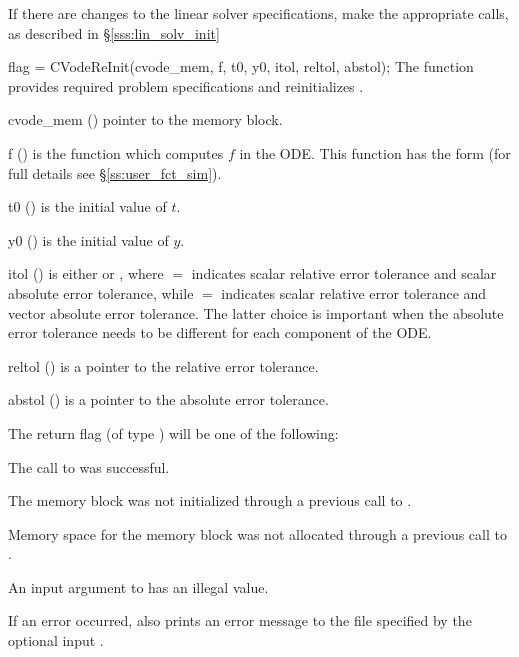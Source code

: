 If there are changes to the linear solver specifications, make the
appropriate  calls, as described in \S\ref{sss:lin_solv_init}

{
  flag = CVodeReInit(cvode\_mem, f, t0, y0, itol, reltol, abstol);
}
{
  The function  provides required problem specifications 
  and reinitializes {\cvode}.
}
{
  \begin{args}
  \item[cvode\_mem] ()
    pointer to the {\cvode} memory block.
  \item[f] ()
    is the {\C} function which computes $f$ in the ODE. This function has the form 
     (for full details see \S\ref{ss:user_fct_sim}).
  \item[t0] ()
    is the initial value of $t$.
  \item[y0] ()
    is the initial value of $y$. 
  \item[itol] () 
    is either  or , where $=$ indicates
    scalar relative error tolerance and scalar absolute error tolerance, while
    $=$ indicates scalar relative error tolerance and vector
    absolute error tolerance.  The latter choice is important when the absolute
    error tolerance needs to be different for each component of the ODE. 
  \item[reltol] ()
    is a pointer to the relative error tolerance.
  \item[abstol] ()
    is a pointer to the absolute error tolerance.
  \end{args}
}
{
  The return flag  (of type ) will be one of the following:
  \begin{args}[CV\_NO\_MALLOC]
  \item[\Id{CV\_SUCCESS}]
    The call to  was successful.
  \item[\Id{CV\_MEM\_NULL}] 
    The {\cvode} memory block was not initialized through a 
    previous call to .
  \item[\Id{CV\_NO\_MALLOC}] 
    Memory space for the {\cvode} memory block was not allocated through a 
    previous call to .
  \item[\Id{CV\_ILL\_INPUT}] 
    An input argument to  has an illegal value.
  \end{args}
}
{
  If an error occurred,  also prints an error message to the
  file specified by the optional input .
}


